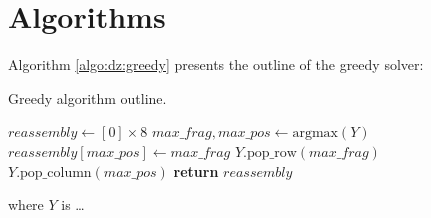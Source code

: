 
\section{Algorithms}
\label{sec:mth1:algo}

Algorithm \ref{algo:dz:greedy} presents the outline of the greedy solver:

\begin{algorithm}
    \caption[Greedy algorithm outline]{Greedy algorithm outline.}
    \label{algo:dz:greedy}
    \begin{algorithmic}[1]
        \State $reassembly \gets [0] \times 8$
            \State $max\_frag, max\_pos \gets \text{argmax}(Y)$
            \State $reassembly[max\_pos] \gets max\_frag$
            \State $Y.\text{pop\_row}(max\_frag)$
            \State $Y.\text{pop\_column}(max\_pos)$
        \EndWhile
        \State \textbf{return} $reassembly$
        \EndProcedure
    \end{algorithmic}
\end{algorithm}
\newthought{}where $Y$ is …